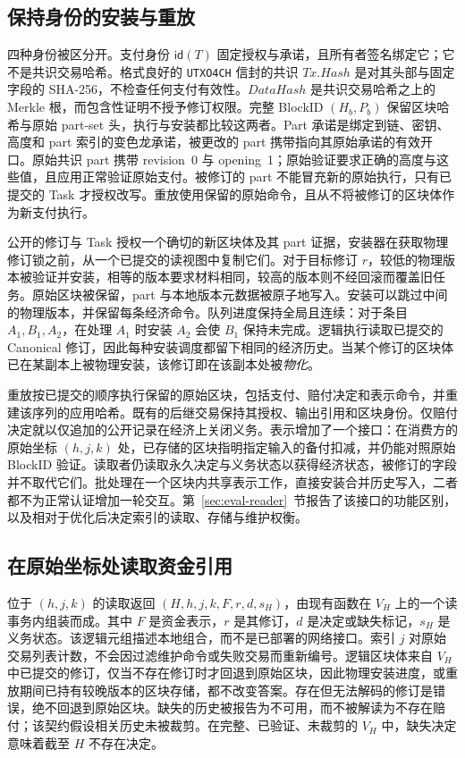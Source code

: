 \subsection{保持身份的安装与重放}
\label{sec:protocol-installation}

四种身份被区分开。支付身份 $\mathsf{id}(T)$ 固定授权与承诺，且所有者签名绑定它；它不是共识交易哈希。格式良好的 \texttt{UTXO4CH} 信封的共识 $\mathit{Tx.Hash}$ 是对其头部与固定字段的 SHA-256，不检查任何支付有效性。$\mathit{DataHash}$ 是共识交易哈希之上的 Merkle 根，而包含性证明不授予修订权限。完整 BlockID $(H_b,P_b)$ 保留区块哈希与原始 part-set 头，执行与安装都比较这两者。Part 承诺是绑定到链、密钥、高度和 part 索引的变色龙承诺，被更改的 part 携带指向其原始承诺的有效开口。原始共识 part 携带 revision~0 与 opening~1；原始验证要求正确的高度与这些值，且应用正常验证原始支付。被修订的 part 不能冒充新的原始执行，只有已提交的 Task 才授权改写。重放使用保留的原始命令，且从不将被修订的区块体作为新支付执行。

公开的修订与 Task 授权一个确切的新区块体及其 part 证据，安装器在获取物理修订锁之前，从一个已提交的读视图中复制它们。对于目标修订 $r$，较低的物理版本被验证并安装，相等的版本要求材料相同，较高的版本则不经回滚而覆盖旧任务。原始区块被保留，part 与本地版本元数据被原子地写入。安装可以跳过中间的物理版本，并保留每条经济命令。队列进度保持全局且连续：对于条目 $A_1,B_1,A_2$，在处理 $A_1$ 时安装 $A_2$ 会使 $B_1$ 保持未完成。逻辑执行读取已提交的 Canonical 修订，因此每种安装调度都留下相同的经济历史。当某个修订的区块体已在某副本上被物理安装，该修订即在该副本处被\emph{物化}。

重放按已提交的顺序执行保留的原始区块，包括支付、赔付决定和表示命令，并重建该序列的应用哈希。既有的后继交易保持其授权、输出引用和区块身份。仅赔付决定就以仅追加的公开记录在经济上关闭义务。表示增加了一个接口：在消费方的原始坐标 $(h,j,k)$ 处，已存储的区块指明指定输入的备付扣减，并仍能对照原始 BlockID 验证。读取者仍读取永久决定与义务状态以获得经济状态，被修订的字段并不取代它们。批处理在一个区块内共享表示工作，直接安装合并历史写入，二者都不为正常认证增加一轮交互。第~\ref{sec:eval-reader}~节报告了该接口的功能区别，以及相对于优化后决定索引的读取、存储与维护权衡。

\subsection{在原始坐标处读取资金引用}
\label{sec:protocol-reader}

位于 $(h,j,k)$ 的读取返回 $(H,h,j,k,F,r,d,s_H)$，由现有函数在 $V_H$ 上的一个读事务内组装而成。其中 $F$ 是资金表示，$r$ 是其修订，$d$ 是决定或缺失标记，$s_H$ 是义务状态。该逻辑元组描述本地组合，而不是已部署的网络接口。索引 $j$ 对原始交易列表计数，不会因过滤维护命令或失败交易而重新编号。逻辑区块体来自 $V_H$ 中已提交的修订，仅当不存在修订时才回退到原始区块，因此物理安装进度，或重放期间已持有较晚版本的区块存储，都不改变答案。存在但无法解码的修订是错误，绝不回退到原始区块。缺失的历史被报告为不可用，而不被解读为不存在赔付；该契约假设相关历史未被裁剪。在完整、已验证、未裁剪的 $V_H$ 中，缺失决定意味着截至 $H$ 不存在决定。

